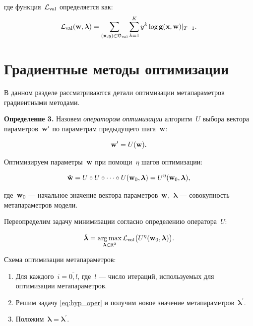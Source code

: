 \documentclass[12pt, twoside]{article}
\begin{document}
\noindent
где функция~$\mathcal{L}_\text{val}$ определяется как: 
 \begin{equation} \label{eq:l_val}
     \cL_\text{val}(\bw, \boldsymbol{\lambda}) = \sum\limits_{(\bx, y) \in \fD_\text{val}}\sum\limits_{k=1}^{K}y^k\log \bg(\bx, \bw)|_{T=1}.
 \end{equation}



\section{Градиентные методы оптимизации}

В данном разделе рассматриваются детали оптимизации метапараметров градиентными методами.

\textbf{Определение 3.} Назовем \emph{оператором оптимизации} алгоритм~$U$ выбора вектора параметров~$\mathbf{w}^\prime$ по параметрам предыдущего шага~$\mathbf{w}$:

\begin{equation*}
    \mathbf{w}^\prime = U(\mathbf{w}).
\end{equation*}

Оптимизируем параметры~$\mathbf{w}$ при помощи~$\eta$ шагов оптимизации:

\begin{equation} \label{eq:oper_superp}
    \hat{\bw} = U \circ U \circ \dots \circ U(\bw_0, \boldsymbol{\lambda}) = U^\eta(\bw_0, \boldsymbol{\lambda}),
\end{equation}

\noindent
где~$\mathbf{w}_0$ --- начальное значение вектора параметров~$\mathbf{w}$,~$\boldsymbol{\lambda}$ --- совокупность метапараметров модели.

Переопределим задачу минимизации согласно определению оператора~$U$:

\begin{equation} \label{eq:hyp_oper}
    \hat{\boldsymbol{\lambda}} = \argmax\limits_{\boldsymbol{\lambda} \in \bbR^3} \cL_\text{val}\bigl(U^\eta(\bw_0, \boldsymbol{\lambda})\bigr).
\end{equation}

Схема оптимизации метапараметров:

\begin{enumerate}
    \item Для каждого~$i = \overline{0, l}$, где~$l$ --- число итераций, используемых для оптимизации метапараметров.
    \item Решим задачу \eqref{eq:hyp_oper} и получим новое значение метапараметров~$\boldsymbol{\lambda}^\prime$.
    \item Положим~$\boldsymbol{\lambda} = \boldsymbol{\lambda}^\prime$.
\end{enumerate}
\end{document}
